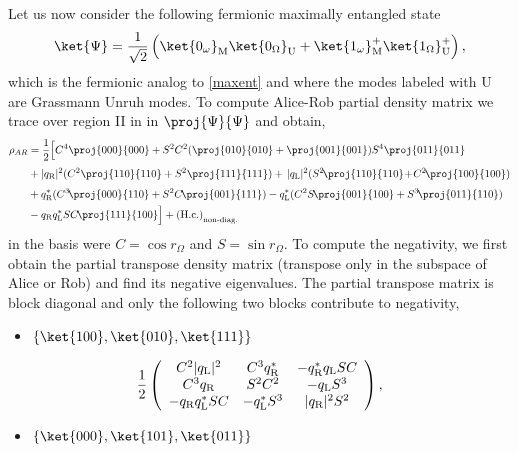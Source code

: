  Let us now consider the following fermionic maximally entangled state
\begin{equation}\label{eq:states}
\ket{\Psi}=\frac{1}{\sqrt2}\left(\ket{0_\omega}_{\text M}\ket{0_\Omega}_\text{U}+\ket{1_\omega}^+_{\text{M}}\ket{1_\Omega}^+_\text{U}\right),
\end{equation}
which is the fermionic analog to \eqref{maxent} and where the modes labeled with $\text{U}$ are Grassmann Unruh modes. To  compute Alice-Rob partial density matrix  we trace over region II in in $\proj{\Psi}{\Psi}$ and obtain,  
\begin{align}\label{ek1}
\nonumber\rho_{AR}&=\frac{1}{2}\Big[C^4\proj{000}{000}+S^2C^2(\proj{010}{010}+\proj{001}{001})S^4\proj{011}{011}\\*
\nonumber&+|q_\text{\text{R}}|^2(C^2\proj{110}{110}+S^2\proj{111}{111})+\phantom{\Big[}\!\!|q_\text{\text{L}}|^2(S^2\!\proj{110}{110}\!+\!C^2\!\proj{100}{100})\\*
\nonumber&+q_\text{\text{R}}^*(C^3\!\proj{000}{110}+S^2C\!\proj{001}{111})-q_\text{\text{L}}^*(C^2S\!\proj{001}{100}+S^3\!\proj{011}{110})\\*
&-q_\text{R} q_\text{L}^*SC\!\proj{111}{100}\Big]+(\text{H.c.})_{_{\substack{\text{non-}\text{diag.}}}}
\end{align}
in the basis were $C=\cos r_{\Omega}$ and $S=\sin r_{\Omega}$. To compute the negativity, we first obtain the partial transpose density matrix (transpose only in the subspace of Alice or Rob) and find its negative eigenvalues. The partial transpose matrix is block diagonal and only the following two blocks contribute to negativity,
\begin{itemize}
\item $\{\ket{100},\ket{010},\ket{111}\}$
\end{itemize}
\begin{equation}
\frac12\left(\begin{array}{ccc}
 C^2|q_\text{\text{L}}|^2& C^3q_\text{\text{R}}^*&-q_\text{R}^* q_\text{L}SC\\
C^3q_\text{\text{R}}& S^2C^2& -q_\text{\text{L}} S^3\\
-q_\text{R} q_\text{L}^*SC & -q_\text{\text{L}}^* S^3&|q_\text{\text{R}}|^2S^2\\
\end{array}\right),
\end{equation}
\begin{itemize}
\item $\{\ket{000},\ket{101},\ket{011}\}$
\end{itemize}
